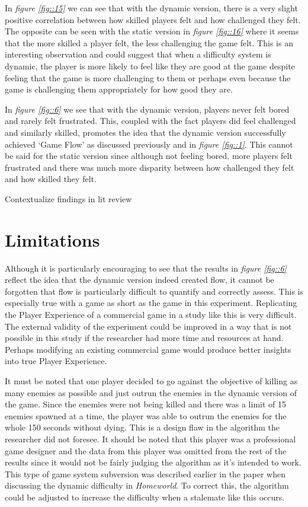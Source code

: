 \documentclass[journal]{IEEEtran}
\begin{document}
In \textit{figure \ref{fig::15}} we can see that with the dynamic version, there is a very slight positive correlation between how skilled players felt and how challenged they felt. The opposite can be seen with the static version in \textit{figure \ref{fig::16}} where it seems that the more skilled a player felt, the less challenging the game felt. This is an interesting observation and could suggest that when a difficulty system is dynamic, the player is more likely to feel like they are good at the game despite feeling that the game is more challenging to them or perhaps even because the game is challenging them appropriately for how good they are.

In \textit{figure \ref{fig::6}} we see that with the dynamic version, players never felt bored and rarely felt frustrated. This, coupled with the fact players did feel challenged and similarly skilled, promotes the idea that the dynamic version successfully achieved `Game Flow' as discussed previously and in \textit{figure \ref{fig::1}}. This cannot be said for the static version since although not feeling bored, more players felt frustrated and there was much more disparity between how challenged they felt and how skilled they felt. 

Contextualize findings in lit review


\section{Limitations}

Although it is particularly encouraging to see that the results in \textit{figure \ref{fig::6}} reflect the idea that the dynamic version indeed created flow, it cannot be forgotten that flow is particularly difficult to quantify and correctly assess. This is especially true with a game as short as the game in this experiment. Replicating the Player Experience of a commercial game in a study like this is very difficult. The external validity of the experiment could be improved in a way that is not possible in this study if the researcher had more time and resources at hand. Perhaps modifying an existing commercial game would produce better insights into true Player Experience.

It must be noted that one player decided to go against the objective of killing as many enemies as possible and just outrun the enemies in the dynamic version of the game. Since the enemies were not being killed and there was a limit of 15 enemies spawned at a time, the player was able to outrun the enemies for the whole 150 seconds without dying. This is a design flaw in the algorithm the researcher did not foresee. It should be noted that this player was a professional game designer and the data from this player was omitted from the rest of the results since it would not be fairly judging the algorithm as it's intended to work. This type of game system subversion was described earlier in the paper when discussing the dynamic difficulty in \textit{Homeworld}. To correct this, the algorithm could be adjusted to increase the difficulty when a stalemate like this occurs.
\end{document}
